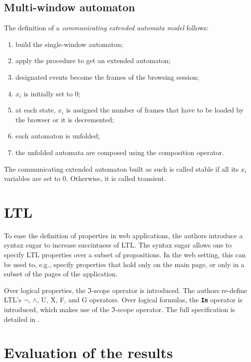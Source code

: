 \documentclass[a4paper,10pt]{article}
\theoremstyle{plain} %
\theoremstyle{definition}
\theoremstyle{remark}
\begin{document}
\subsection{Multi-window automaton}

The definition of a \textit{communicating extended automata model} follows:

\begin{enumerate}
  \item build the single-window automaton;
  \item apply the procedure to get an extended automaton;
  \item designated events become the frames of the browsing session;
  \item $x_i$ is initially set to 0;
  \item at each state, $x_i$ is assigned the number of frames that have to be loaded by the browser or it is decremented;
  \item each automaton is unfolded;
  \item the unfolded automata are composed using the composition operator.
\end{enumerate}

The communicating extended automaton built as such is called stable if all its $x_i$ variables are set to 0. Otherwise, it is called transient.

\section{LTL}

To ease the definition of properties in web applications, the authors introduce a syntax sugar to increase succintness of LTL. The syntax sugar allows one to specify LTL properties over a subset of propositions. In the web setting, this can be used to, e.g., specify properties that hold only on the main page, or only in a subset of the pages of the application.

Over logical properties, the $\mathcal{\Im}$-scope operator is introduced. The authors re-define LTL's $\neg$, $\land$, U, X, F, and G operators. Over logical formulas, the \textbf{\texttt{In}} operator is introduced, which makes use of the $\mathcal{\Im}$-scope operator. The full specification is detailed in \cite{Haydar2005}.

\section{Evaluation of the results}
\end{document}
